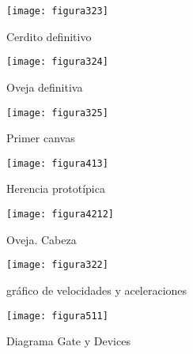 \begin{figure}
\texttt{[image: figura323]}\\
\centering
\caption{Cerdito definitivo}
\end{figure}


\begin{figure}
\texttt{[image: figura324]}\\
\centering
\caption{Oveja definitiva}
\end{figure}


\begin{figure}
\texttt{[image: figura325]}
\centering
\caption{Primer canvas}
\end{figure}


\begin{figure}
\texttt{[image: figura413]}\\
\centering
\caption{Herencia prototípica}
\end{figure}


\begin{figure}
\texttt{[image: figura4212]}\\
\centering
\caption{Oveja. Cabeza}
\end{figure}

 
\begin{figure}
\texttt{[image: figura322]}\\
\centering
\caption{gráfico de velocidades y aceleraciones}
\end{figure}


\begin{figure}[h!]
\texttt{[image: figura511]}\\
\centering
\caption{Diagrama Gate y Devices}
\end{figure}

